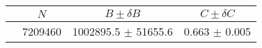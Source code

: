 \begin{tabular}{lccc}
\hline
    &   $N$   & $B \pm \delta B$  &  $C \pm \delta C$ \\
\hline
                               & 7209460    & 1002895.5  $\pm$ 51655.6 & 0.663      $\pm$ 0.005 \\
\hline
\end{tabular}
